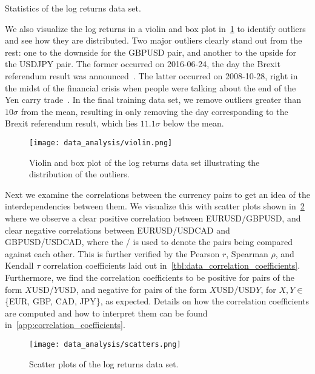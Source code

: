 \begin{table}[!htb]
    \centering
    \begin{adjustbox}{max width=\textwidth}
        
    \end{adjustbox}
    \caption{Statistics of the log returns data set.}
    \label{tbl:data_log_returns_raw_stats}
\end{table}

We also visualize the log returns in a violin and box plot in~\cref{fig:violin_raw} to identify outliers and see how they are distributed.
Two major outliers clearly stand out from the rest: one to the downside for the GBPUSD pair, and another to the upside for the USDJPY pair.
The former occurred on 2016-06-24, the day the Brexit referendum result was announced~\cite{brexit_gov_uk}.
The latter occurred on 2008-10-28, right in the midst of the financial crisis when people were talking about the end of the Yen carry trade~\cite{jpy_carry_trade_nyt}.
In the final training data set, we remove outliers greater than \( 10\sigma \) from the mean, resulting in only removing the day corresponding to the Brexit referendum result, which lies \( 11.1\sigma \) below the mean.
\begin{figure}[!htb]
    \begin{center}
        \texttt{[image: data\_analysis/violin.png]}
    \end{center}
    \caption{Violin and box plot of the log returns data set illustrating the distribution of the outliers.}
    \label{fig:violin_raw}
\end{figure}

Next we examine the correlations between the currency pairs to get an idea of the interdependencies between them.
We visualize this with scatter plots shown in~\cref{fig:scatters} where we observe a clear positive correlation between EURUSD/GBPUSD, and clear negative correlations between EURUSD/USDCAD and GBPUSD/USDCAD, where the / is used to denote the pairs being compared against each other.
This is further verified by the Pearson \( r \), Spearman \( \rho \), and Kendall \( \tau \) correlation coefficients laid out in~\cref{tbl:data_correlation_coefficients}.
Furthermore, we find the correlation coefficients to be positive for pairs of the form \( X \)USD/\( Y \)USD, and negative for pairs of the form \( X \)USD/USD\( Y \), for \( X,Y \in \) \{EUR, GBP, CAD, JPY\}, as expected.
Details on how the correlation coefficients are computed and how to interpret them can be found in~\cref{app:correlation_coefficients}.
\begin{figure}[!htb]
    \begin{center}
        \texttt{[image: data\_analysis/scatters.png]}
    \end{center}
    \caption{Scatter plots of the log returns data set.}
    \label{fig:scatters}
\end{figure}

